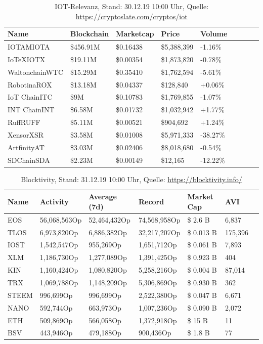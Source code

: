 \begin{table}[]
\centering
\begin{tabular}{@{}lllllllll@{}}
\toprule
\textbf{Name} & \textbf{Blockchain} & \textbf{Marketcap} & \textbf{Price} & \textbf{Volume} \\ \midrule
IOTAMIOTA & \$456.91M & \$0.16438 & \$5,388,399 & -1.16\% \\
IoTeXIOTX & \$19.11M & \$0.00354 & \$1,873,820 & -0.78\% \\
WaltonchainWTC & \$15.29M & \$0.35410 & \$1,762,594 & -5.61\% \\
RobotinaROX & \$13.18M & \$0.04337 & \$128,840 & +0.06\% \\
IoT ChainITC & \$9M & \$0.10783 & \$1,769,855 & -1.07\% \\
INT ChainINT & \$6.58M & \$0.01732 & \$1,032,942 & +1.77\% \\
RuffRUFF & \$5.11M & \$0.00521 & \$904,692 & +1.24\% \\
XensorXSR & \$3.58M & \$0.01008 & \$5,971,333 & -38.27\% \\
ArtfinityAT & \$3.03M & \$0.02406 & \$8,018,680 & -0.54\% \\
SDChainSDA & \$2.23M & \$0.00149 & \$12,165 & -12.22\% \\ \bottomrule
\end{tabular}
\caption{IOT-Relevanz, Stand: 30.12.19 10:00 Uhr, Quelle: \url{https://cryptoslate.com/cryptos/iot}}
\label{tab:_iot}
\end{table}



\begin{table}[]
\centering
\begin{tabular}{@{}lllllll@{}}
\toprule
\textbf{Name} & \textbf{Activity} & \textbf{Average (7d)} & \textbf{Record} & \textbf{Market Cap} & \textbf{AVI} \\ \midrule
EOS & 56,068,563Op & 52,464,432Op & 74,568,958Op & \$ 2.6 B & 6,837 \\
TLOS & 6,973,820Op & 6,886,382Op & 32,217,207Op & \$ 0.013 B & 175,396 \\
IOST & 1,542,547Op & 955,269Op & 1,651,712Op & \$ 0.061 B & 7,893 \\
XLM & 1,186,730Op & 1,277,089Op & 1,391,425Op & \$ 0.923 B & 404 \\
KIN & 1,160,424Op & 1,080,820Op & 5,258,216Op & \$ 0.004 B & 87,014 \\
TRX & 1,069,788Op & 1,148,209Op & 5,306,869Op & \$ 0.930 B & 362 \\
STEEM & 996,699Op & 996,699Op & 2,522,380Op & \$ 0.047 B & 6,671 \\
NANO & 592,744Op & 663,973Op & 1,007,236Op & \$ 0.090 B & 2,072 \\
ETH & 509,869Op & 566,058Op & 1,372,918Op & \$ 15 B & 11 \\
BSV & 443,946Op & 479,188Op & 900,436Op & \$ 1.8 B & 77 \\ \bottomrule
\end{tabular}
\caption{Blocktivity, Stand: 31.12.19 10:00 Uhr, Quelle: \url{https://blocktivity.info/}}
\label{tab:_blocktivity}
\end{table}



